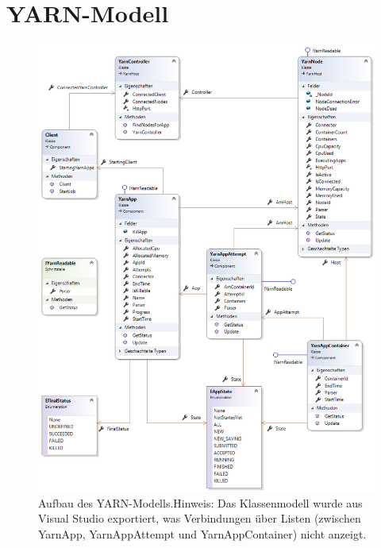 \section{YARN-Modell}\label{sec:yarnModel}

\begin{figure}
	\centering
	\includegraphics[width=\columnwidth]{./images/yarnModel.png}
	\caption[Aufbau des YARN-Modells]{Aufbau des YARN-Modells.\newline Hinweis: Das Klassenmodell wurde aus Visual Studio exportiert, was Verbindungen über Listen (zwischen YarnApp, YarnAppAttempt und YarnAppContainer) nicht anzeigt.}
	\label{fig:hdfsarch}
\end{figure}